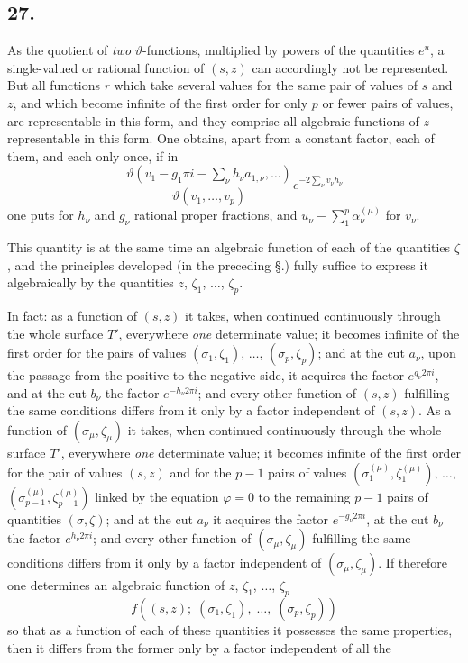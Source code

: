 \documentclass{article}
\begin{document}
\subsection*{27.}

As the quotient of \emph{two} $\vartheta$-functions, multiplied by powers of the quantities $e^{u}$, a single-valued or rational function of $(s, z)$ can accordingly not be represented. But all functions $r$ which take several values for the same pair of values of $s$ and $z$, and which become infinite of the first order for only $p$ or fewer pairs of values, are representable in this form, and they comprise all algebraic functions of $z$ representable in this form. One obtains, apart from a constant factor, each of them, and each only once, if in
\[ \frac{\vartheta\left(v_{1} - g_{1}\pi i - \displaystyle\sum_{\nu} h_{\nu} a_{1,\nu}, \ldots\right)}{\vartheta(v_{1}, \ldots, v_{p})} e^{-2 \sum_{\nu} v_{\nu} h_{\nu}} \]
one puts for $h_{\nu}$ and $g_{\nu}$ rational proper fractions, and $u_{\nu} - \displaystyle\sum_{1}^{p} \alpha_{\nu}^{(\mu)}$ for $v_{\nu}$.

This quantity is at the same time an algebraic function of each of the quantities $\zeta$, and the principles developed (in the preceding §.) fully suffice to express it algebraically by the quantities $z$, $\zeta_{1}$, $\ldots$, $\zeta_{p}$.

In fact: as a function of $(s, z)$ it takes, when continued continuously through the whole surface $T'$, everywhere \emph{one} determinate value; it becomes infinite of the first order for the pairs of values $(\sigma_{1}, \zeta_{1})$, $\ldots$, $(\sigma_{p}, \zeta_{p})$; and at the cut $a_{\nu}$, upon the passage from the positive to the negative side, it acquires the factor $e^{g_{\nu} 2\pi i}$, and at the cut $b_{\nu}$ the factor $e^{-h_{\nu} 2\pi i}$; and every other function of $(s, z)$ fulfilling the same conditions differs from it only by a factor independent of $(s, z)$. As a function of $(\sigma_{\mu}, \zeta_{\mu})$ it takes, when continued continuously through the whole surface $T'$, everywhere \emph{one} determinate value; it becomes infinite of the first order for the pair of values $(s, z)$ and for the $p-1$ pairs of values $(\sigma_{1}^{(\mu)}, \zeta_{1}^{(\mu)})$, $\ldots$, $(\sigma_{p-1}^{(\mu)}, \zeta_{p-1}^{(\mu)})$ linked by the equation $\varphi = 0$ to the remaining $p-1$ pairs of quantities $(\sigma, \zeta)$; and at the cut $a_{\nu}$ it acquires the factor $e^{-g_{\nu} 2\pi i}$, at the cut $b_{\nu}$ the factor $e^{h_{\nu} 2\pi i}$; and every other function of $(\sigma_{\mu}, \zeta_{\mu})$ fulfilling the same conditions differs from it only by a factor independent of $(\sigma_{\mu}, \zeta_{\mu})$. If therefore one determines an algebraic function of $z$, $\zeta_{1}$, $\ldots$, $\zeta_{p}$
\[ f((s, z); \; (\sigma_{1}, \zeta_{1}), \; \ldots, \; (\sigma_{p}, \zeta_{p})) \]
so that as a function of each of these quantities it possesses the same properties, then it differs from the former only by a factor independent of all the
\end{document}
